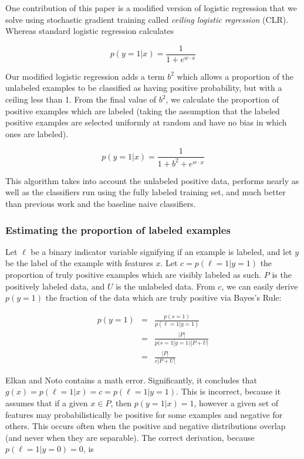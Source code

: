 \documentclass{article}
\begin{document}
One contribution of this paper is a modified version of logistic regression that we solve using stochastic gradient training called \emph{ceiling logistic regression} (CLR).  Whereas standard logistic regression calculates

$$ p(y=1|x) = \frac{1}{1 + e^{w \cdot x}} $$

Our modified logistic regression adds a term $b^2$ which allows a proportion of the unlabeled examples to be classified as having positive probability, but with a ceiling less than 1. From the final value of $b^2$, we calculate the proportion of positive examples which are labeled (taking the assumption that the labeled positive examples are selected uniformly at random and have no bias in which ones are labeled).

$$ p(y=1|x) = \frac{1}{1 + b^2 + e^{w \cdot x}} $$

This algorithm takes into account the unlabeled positive data, performs nearly as well as the classifiers run using the fully labeled training set, and much better than previous work and the baseline naive classifiers.

\subsubsection{Estimating the proportion of labeled examples}

Let $\ell$ be a binary indicator variable signifying if an example is labeled, and let $y$ be the label of the example with features $x$. Let $c = p(\ell=1|y=1)$ the proportion of truly positive examples which are visibly labeled as such. $P$ is the positively labeled data, and $U$ is the unlabeled data. From $c$, we can easily derive $p(y=1)$ the fraction of the data which are truly positive via Bayes's Rule:

\begin{eqnarray*}
p(y=1) &=& \frac{p(s=1)}{p(\ell = 1|y = 1)} \\
 &=&  \frac{|P|}{p(s = 1|y = 1)|P+U|} \\
 &=& \frac{|P|}{c|P+U|}
\end{eqnarray*}

Elkan and Noto  contains a math error.  Significantly, it concludes that $g(x) = p(\ell=1|x) = c = p(\ell=1|y=1)$. This is incorrect, because it assumes that if a given $x \in P$, then $p(y=1|x) = 1$, however a given set of features may probabilistically be positive for some examples and negative for others. This occurs often when the positive and negative distributions overlap (and never when they are separable). The correct derivation, because $p(\ell=1|y=0)=0$, is
\end{document}
